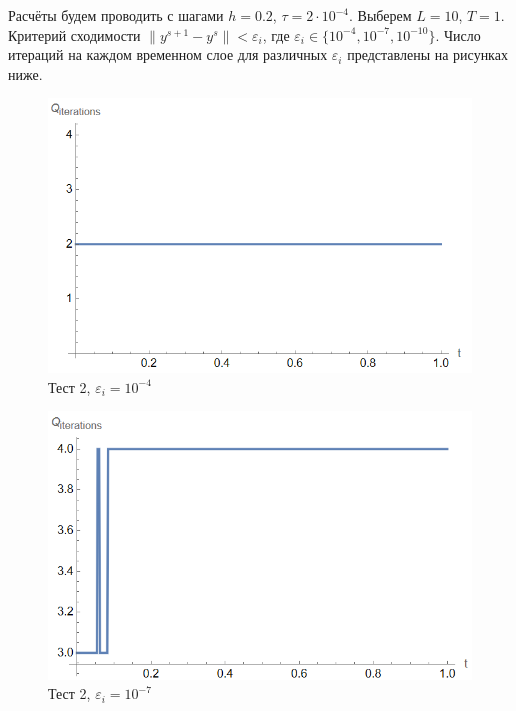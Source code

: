 \documentclass[12pt, a4paper]{article}
\begin{document}
	Расчёты будем проводить с шагами $h=0.2$, $\tau=2\cdot 10^{-4}$. Выберем $L=10$, $T=1$.  Критерий сходимости $\|y^{s+1}-y^{s}\| < \varepsilon_i$, где $\varepsilon_i \in \{10^{-4},10^{-7},10^{-10}\}$. Число итераций на каждом временном слое для различных $\varepsilon_i$ представлены на рисунках ниже.
	
	 \begin{figure}[H]
		\centering
		\includegraphics[width=1\textwidth]{test3-1e-4}
		\caption{Тест 2, $\varepsilon_i=10^{-4}$}
	\end{figure}
	
	\begin{figure}[H]
		\centering
		\includegraphics[width=1\textwidth]{test3-1e-7}
		\caption{Тест 2, $\varepsilon_i=10^{-7}$}
	\end{figure}
	
\end{document}
